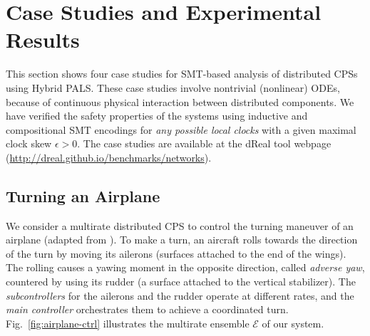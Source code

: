 
%
\section{Case Studies and Experimental Results}
\label{sec:case-studies}

This section shows four case studies for SMT-based analysis of 
distributed CPSs using Hybrid PALS.
%
These case studies involve nontrivial (nonlinear) ODEs,
because of continuous physical interaction between distributed components.
We have verified the safety properties of the systems
using %
inductive and compositional SMT encodings
for \emph{any possible local clocks} with a given maximal clock skew $\epsilon > 0$.
%
The case studies are available at the \textsf{dReal} tool webpage (\url{http://dreal.github.io/benchmarks/networks}).






\subsection{Turning an Airplane}
\label{sec:ex-airplane}

We consider a multirate distributed CPS
to control the turning maneuver of an airplane (adapted from \cite{ftscs-journal}).
%
To make a turn, an aircraft rolls towards the direction of the turn
by moving its ailerons (surfaces attached to the end of the wings).
The rolling causes 
a yawing moment in the opposite direction, called \emph{adverse yaw},
countered by using its rudder (a surface attached to the vertical stabilizer).
%
The \emph{subcontrollers} for the ailerons and the rudder operate at different rates, 
and the \emph{main controller} orchestrates them to achieve a coordinated turn.
%
Fig.~\ref{fig:airplane-ctrl} illustrates the multirate ensemble $\mathcal{E}$ of our system.


